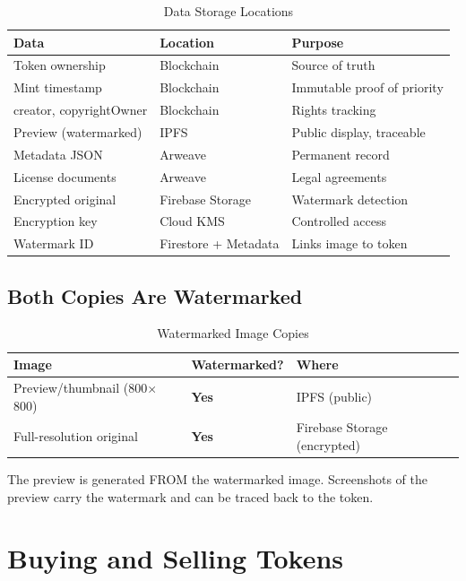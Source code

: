 \documentclass[11pt,a4paper]{article}
\begin{document}
\begin{table}[h]
\centering
\begin{tabular}{@{}L{4cm}L{4cm}L{4cm}@{}}
\toprule
\textbf{Data} & \textbf{Location} & \textbf{Purpose} \\
\midrule
Token ownership & Blockchain & Source of truth \\
Mint timestamp & Blockchain & Immutable proof of priority \\
creator, copyrightOwner & Blockchain & Rights tracking \\
Preview (watermarked) & IPFS & Public display, traceable \\
Metadata JSON & Arweave & Permanent record \\
License documents & Arweave & Legal agreements \\
Encrypted original & Firebase Storage & Watermark detection \\
Encryption key & Cloud KMS & Controlled access \\
Watermark ID & Firestore + Metadata & Links image to token \\
\bottomrule
\end{tabular}
\caption{Data Storage Locations}
\end{table}

\subsection{Both Copies Are Watermarked}

\begin{table}[h]
\centering
\begin{tabular}{@{}lll@{}}
\toprule
\textbf{Image} & \textbf{Watermarked?} & \textbf{Where} \\
\midrule
Preview/thumbnail (800$\times$800) & \textbf{Yes} & IPFS (public) \\
Full-resolution original & \textbf{Yes} & Firebase Storage (encrypted) \\
\bottomrule
\end{tabular}
\caption{Watermarked Image Copies}
\end{table}

The preview is generated FROM the watermarked image. Screenshots of the preview carry the watermark and can be traced back to the token.

\newpage
\section{Buying and Selling Tokens}
\end{document}
